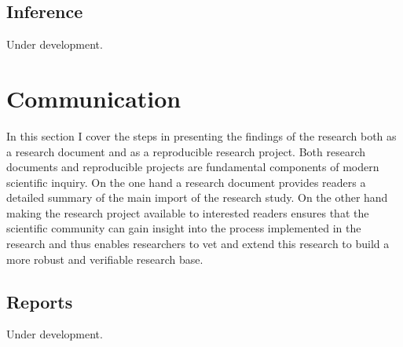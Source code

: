 \documentclass[
  letterpaper,
  DIV=11,
  numbers=noendperiod]{scrreport}
\theoremstyle{definition}
\theoremstyle{remark}
\begin{document}
\hypertarget{sec-inference}{%
\chapter{Inference}\label{sec-inference}}

\begin{tcolorbox}[enhanced jigsaw, breakable, arc=.35mm, opacityback=0, bottomrule=.15mm, colback=white, opacitybacktitle=0.6, colframe=quarto-callout-caution-color-frame, toptitle=1mm, colbacktitle=quarto-callout-caution-color!10!white, left=2mm, leftrule=.75mm, toprule=.15mm, title=\textcolor{quarto-callout-caution-color}{\faFire}\hspace{0.5em}{Caution}, bottomtitle=1mm, coltitle=black, titlerule=0mm, rightrule=.15mm]

Under development.

\end{tcolorbox}

\part{Communication}

In this section I cover the steps in presenting the findings of the
research both as a research document and as a reproducible research
project. Both research documents and reproducible projects are
fundamental components of modern scientific inquiry. On the one hand a
research document provides readers a detailed summary of the main import
of the research study. On the other hand making the research project
available to interested readers ensures that the scientific community
can gain insight into the process implemented in the research and thus
enables researchers to vet and extend this research to build a more
robust and verifiable research base.

\hypertarget{sec-reports}{%
\chapter{Reports}\label{sec-reports}}

\begin{tcolorbox}[enhanced jigsaw, breakable, arc=.35mm, opacityback=0, bottomrule=.15mm, colback=white, opacitybacktitle=0.6, colframe=quarto-callout-caution-color-frame, toptitle=1mm, colbacktitle=quarto-callout-caution-color!10!white, left=2mm, leftrule=.75mm, toprule=.15mm, title=\textcolor{quarto-callout-caution-color}{\faFire}\hspace{0.5em}{Caution}, bottomtitle=1mm, coltitle=black, titlerule=0mm, rightrule=.15mm]

Under development.

\end{tcolorbox}
\end{document}
